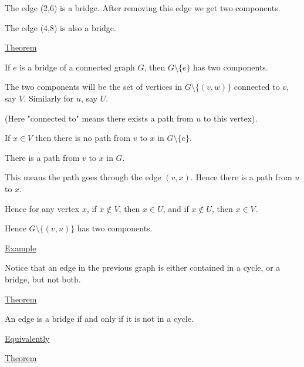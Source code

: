 \documentclass{article}
\begin{document}
The edge (2,6) is a bridge. After removing this edge we get two components. 

The edge (4,8) is also a bridge. 

\underline{Theorem}

If $e$ is a bridge of a connected graph $G$, then $G \setminus \{e\}$ has two components. 

The two components will be the set of vertices in $G \setminus \{(v,w)\}$ connected to $v$, say $V$. Similarly for $u$, say $U$. 

(Here "connected to" means there exists a path from $u$ to this vertex). 

If $x \in V$ then there is no path from $v$ to $x$ in $G \setminus \{e\}$. 

There is a path from $v$ to $x$ in $G$. 

This means the path goes through the edge $(v,x)$. Hence there is a path from $u$ to $x$. 

Hence for any vertex $x$, if $x \not\in V$, then $x \in U$, and if $x \not\in U$, then $x \in V$. 

Hence $G \setminus \{(v,u)\}$ has two components. 

\underline{Example}
\begin{center}
\end{center}

Notice that an edge in the previous graph is either contained in a cycle, or a bridge, but not both. 

\underline{Theorem}

An edge is a bridge if and only if it is not in a cycle. 

\underline{Equivalently}

\underline{Theorem}
\end{document}
